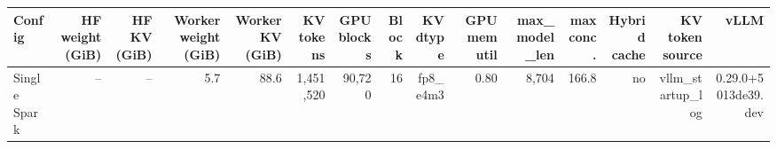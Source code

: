 \begin{tabular}{l r r r r r r r r r r r r r r }
\toprule
Config & HF weight (GiB) & HF KV (GiB) & Worker weight (GiB) & Worker KV (GiB) & KV tokens & GPU blocks & Block & KV dtype & GPU mem util & max\_model\_len & max conc. & Hybrid cache & KV token source & vLLM \\
\midrule
Single Spark & -- & -- & 5.7 & 88.6 & 1,451,520 & 90,720 & 16 & fp8\_e4m3 & 0.80 & 8,704 & 166.8 & no & vllm\_startup\_log & 0.29.0+5013de39.dev \\
\bottomrule
\end{tabular}
